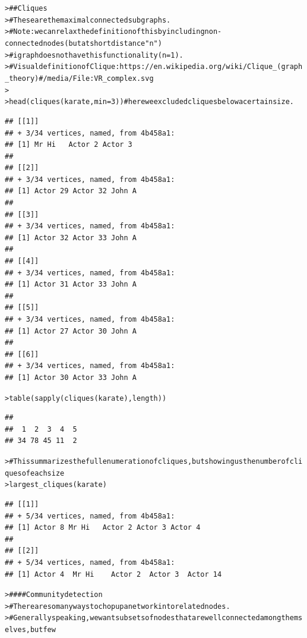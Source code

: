 \documentclass[12pt]{article}\usepackage[]{graphicx}\usepackage[]{color}
\makeatletter
\newcommand{\hlnum}[1]{\textcolor[rgb]{0.82,0.78,0.62}{#1}}%
\newcommand{\hlcom}[1]{\textcolor[rgb]{0.404,0.408,0.42}{#1}}%
\newcommand{\hlstd}[1]{\textcolor[rgb]{0.882,0.878,0.898}{#1}}%
\newcommand{\hlkwc}[1]{\textcolor[rgb]{0.812,0.522,0.388}{#1}}%
\newcommand{\hlkwd}[1]{\textcolor[rgb]{0.733,0.388,0.812}{#1}}%
\newenvironment{kframe}{%
 \def\at@end@of@kframe{}%
 \ifinner\ifhmode%
  \def\at@end@of@kframe{\end{minipage}}%
  \begin{minipage}{\columnwidth}%
 \fi\fi%
 \def\FrameCommand##1{\hskip\@totalleftmargin \hskip-\fboxsep
 \colorbox{shadecolor}{##1}\hskip-\fboxsep
     \hskip-\linewidth \hskip-\@totalleftmargin \hskip\columnwidth}%
 \MakeFramed {\advance\hsize-\width
   \@totalleftmargin\z@ \linewidth\hsize
   \@setminipage}}%
 {\par\unskip\endMakeFramed%
 \at@end@of@kframe}
\newenvironment{knitrout}{}{} %
\makeatother
\begin{document}
\begin{flushleft}
\begin{center}
\begin{knitrout}
\begin{kframe}\begin{alltt}
\hlstd{> }\hlcom{## Cliques}
\hlstd{> }\hlcom{#   These are the maximal connected subgraphs.}
\hlstd{> }\hlcom{#   Note: we can relax the definition of this by including non-connected nodes (but at short distance "n")}
\hlstd{> }\hlcom{#         igraph does not have this functionality (n=1).}
\hlstd{> }\hlcom{# Visual definition of Clique: https://en.wikipedia.org/wiki/Clique_(graph_theory)#/media/File:VR_complex.svg}
\hlstd{> }
\hlstd{> }\hlkwd{head}\hlstd{(}\hlkwd{cliques}\hlstd{(karate,} \hlkwc{min}\hlstd{=}\hlnum{3}\hlstd{))} \hlcom{# here we excluded cliques below a certain size.}
\end{alltt}
\begin{verbatim}
## [[1]]
## + 3/34 vertices, named, from 4b458a1:
## [1] Mr Hi   Actor 2 Actor 3
## 
## [[2]]
## + 3/34 vertices, named, from 4b458a1:
## [1] Actor 29 Actor 32 John A  
## 
## [[3]]
## + 3/34 vertices, named, from 4b458a1:
## [1] Actor 32 Actor 33 John A  
## 
## [[4]]
## + 3/34 vertices, named, from 4b458a1:
## [1] Actor 31 Actor 33 John A  
## 
## [[5]]
## + 3/34 vertices, named, from 4b458a1:
## [1] Actor 27 Actor 30 John A  
## 
## [[6]]
## + 3/34 vertices, named, from 4b458a1:
## [1] Actor 30 Actor 33 John A
\end{verbatim}
\begin{alltt}
\hlstd{> }\hlkwd{table}\hlstd{(}\hlkwd{sapply}\hlstd{(}\hlkwd{cliques}\hlstd{(karate),length))}
\end{alltt}
\begin{verbatim}
## 
##  1  2  3  4  5 
## 34 78 45 11  2
\end{verbatim}
\begin{alltt}
\hlstd{> }\hlcom{# This summarizes the full enumeration of cliques, but showing us the number of cliques of each size}
\hlstd{> }\hlkwd{largest_cliques}\hlstd{(karate)}
\end{alltt}
\begin{verbatim}
## [[1]]
## + 5/34 vertices, named, from 4b458a1:
## [1] Actor 8 Mr Hi   Actor 2 Actor 3 Actor 4
## 
## [[2]]
## + 5/34 vertices, named, from 4b458a1:
## [1] Actor 4  Mr Hi    Actor 2  Actor 3  Actor 14
\end{verbatim}
\begin{alltt}
\hlstd{> }\hlcom{#### Community detection}
\hlstd{> }\hlcom{#    There are so many ways to chop up a network into related nodes.}
\hlstd{> }\hlcom{#    Generally speaking, we want subsets of nodes that are well connected among them selves, but few}

\end{alltt}
\end{kframe}
\end{knitrout}
\end{center}
\end{flushleft}
\end{document}

